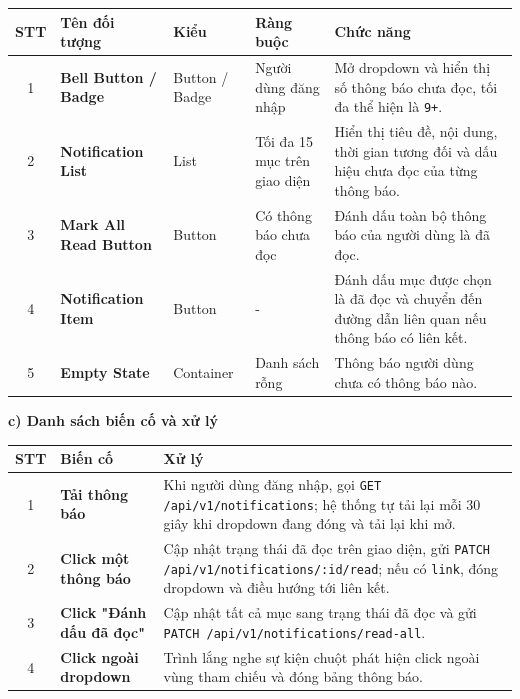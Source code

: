 \documentclass[12pt,a4paper]{article}
\begin{document}
\begin{center}
\renewcommand{\arraystretch}{1.5}
\begin{tabularx}{\textwidth}{|c|l|l|l|X|}
\hline
\rowcolor{blue!20}
\textbf{STT} & \textbf{Tên đối tượng} & \textbf{Kiểu} & \textbf{Ràng buộc} & \textbf{Chức năng} \\ \hline

1 & \textbf{Bell Button / Badge} & Button / Badge & Người dùng đăng nhập & Mở dropdown và hiển thị số thông báo chưa đọc, tối đa thể hiện là \texttt{9+}. \\ \hline

2 & \textbf{Notification List} & List & Tối đa 15 mục trên giao diện & Hiển thị tiêu đề, nội dung, thời gian tương đối và dấu hiệu chưa đọc của từng thông báo. \\ \hline

3 & \textbf{Mark All Read Button} & Button & Có thông báo chưa đọc & Đánh dấu toàn bộ thông báo của người dùng là đã đọc. \\ \hline

4 & \textbf{Notification Item} & Button & - & Đánh dấu mục được chọn là đã đọc và chuyển đến đường dẫn liên quan nếu thông báo có liên kết. \\ \hline

5 & \textbf{Empty State} & Container & Danh sách rỗng & Thông báo người dùng chưa có thông báo nào. \\ \hline

\end{tabularx}
\end{center}

\textbf{c) Danh sách biến cố và xử lý}

\begin{center}
\renewcommand{\arraystretch}{1.5}
\begin{tabularx}{\textwidth}{|c|l|X|}
\hline
\rowcolor{blue!20}
\textbf{STT} & \textbf{Biến cố} & \textbf{Xử lý} \\ \hline

1 & \textbf{Tải thông báo} & Khi người dùng đăng nhập, gọi \texttt{GET /api/v1/notifications}; hệ thống tự tải lại mỗi 30 giây khi dropdown đang đóng và tải lại khi mở. \\ \hline

2 & \textbf{Click một thông báo} & Cập nhật trạng thái đã đọc trên giao diện, gửi \texttt{PATCH /api/v1/notifications/:id/read}; nếu có \texttt{link}, đóng dropdown và điều hướng tới liên kết. \\ \hline

3 & \textbf{Click "Đánh dấu đã đọc"} & Cập nhật tất cả mục sang trạng thái đã đọc và gửi \texttt{PATCH /api/v1/notifications/read-all}. \\ \hline

4 & \textbf{Click ngoài dropdown} & Trình lắng nghe sự kiện chuột phát hiện click ngoài vùng tham chiếu và đóng bảng thông báo. \\ \hline

\end{tabularx}
\end{center}
\end{document}
